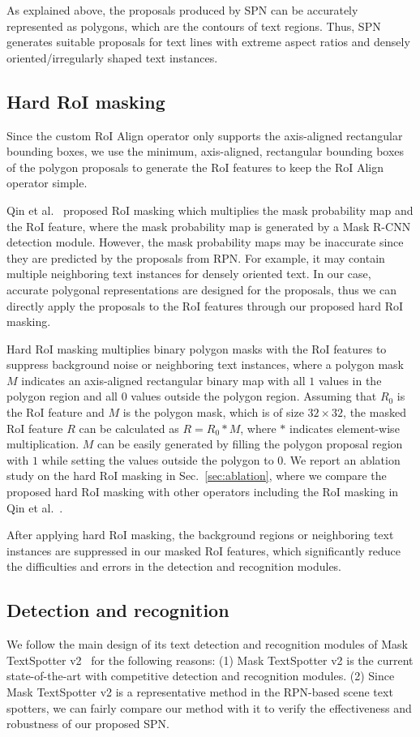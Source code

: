 \documentclass[runningheads]{llncs}
\begin{document}
As explained above, the proposals produced by SPN can be accurately represented as polygons, which are the contours of text regions. Thus, SPN generates suitable proposals for text lines with extreme aspect ratios and densely oriented/irregularly shaped text instances. 

\subsection{Hard RoI masking} \label{sec:roi_masking}
Since the custom RoI Align operator only supports the axis-aligned rectangular bounding boxes, we use the minimum, axis-aligned, rectangular bounding boxes of the polygon proposals to generate the RoI features to keep the RoI Align operator simple.

Qin et al.~\cite{qin2019towards} proposed RoI masking which multiplies the mask probability map and the RoI feature, where the mask probability map is generated by a Mask R-CNN detection module. However, the mask probability maps may be inaccurate since they are predicted by the proposals from RPN. For example, it may contain multiple neighboring text instances for densely oriented text. In our case, accurate polygonal representations are designed for the proposals, thus we can directly apply the proposals to the RoI features through our proposed hard RoI masking.

Hard RoI masking multiplies binary polygon masks with the RoI features to suppress background noise or neighboring text instances, where a polygon mask $M$ indicates an axis-aligned rectangular binary map with all $1$ values in the polygon region and all $0$ values outside the polygon region. Assuming that $R_0$ is the RoI feature and $M$ is the polygon mask, which is of size $32 \times 32$, the masked RoI feature $R$ can be calculated as $R = R_0 * M$,
where $*$ indicates element-wise multiplication. $M$ can be easily generated by filling the polygon proposal region with $1$ while setting the values outside the polygon to $0$. We report an ablation study on the hard RoI masking in Sec.~\ref{sec:ablation}, where we compare the proposed hard RoI masking with other operators including the RoI masking in Qin et al.~\cite{qin2019towards}.

After applying hard RoI masking, the background regions or neighboring text instances are suppressed in our masked RoI features, which significantly reduce the difficulties and errors in the detection and recognition modules.

\subsection{Detection and recognition}
We follow the main design of its text detection and recognition modules of Mask TextSpotter v2~\cite{liao2019mask} for the following reasons: (1) Mask TextSpotter v2 is the current state-of-the-art with competitive detection and recognition modules. (2) Since Mask TextSpotter v2 is a representative method in the RPN-based scene text spotters, we can fairly compare our method with it to verify the effectiveness and robustness of our proposed SPN.
\end{document}
